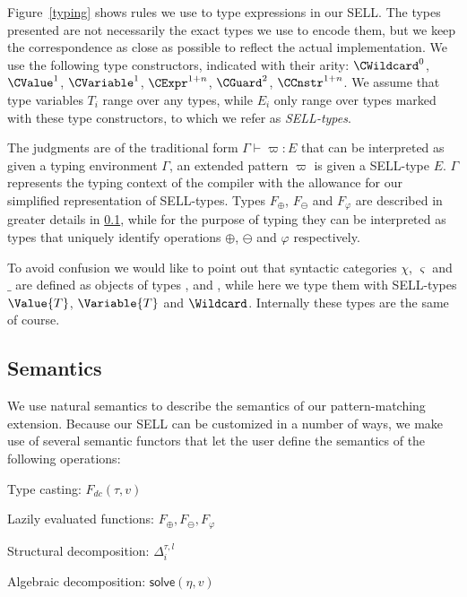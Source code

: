 Figure~\ref{typing} shows rules we use to type expressions in our SELL. The 
types presented are not necessarily the exact \Cpp{} types we use to encode them, 
but we keep the correspondence as close as possible to reflect the actual 
implementation. We use the following type constructors, indicated with their 
arity: $\CWildcard^0$, $\CValue^1$, $\CVariable^1$, $\CExpr^{1+n}$, $\CGuard^2$, 
$\CCnstr^{1+n}$. We assume that type variables $T_i$ range over any \Cpp{} types, 
while $E_i$ only range over types marked with these type constructors, to which 
we refer as \emph{SELL-types}.

The judgments are of the traditional form $\Gamma\vdash \varpi : E$ that can be 
interpreted as given a typing environment $\Gamma$, an extended pattern $\varpi$ is 
given a SELL-type $E$. $\Gamma$ represents the typing context of the \Cpp{} 
compiler with the allowance for our simplified representation of SELL-types.
Types $F_\oplus$, $F_\ominus$ and $F_\varphi$ are described in greater details 
in \textsection\ref{sec:sem}, while for the purpose of typing they can be 
interpreted as types that uniquely identify operations $\oplus$, $\ominus$ and 
$\varphi$ respectively.

To avoid confusion we would like to point out that syntactic categories $\chi$, 
$\varsigma$ and $\_$ are defined as objects of \Cpp{} types , 
 and , while here we type them with SELL-types 
$\Value{T}$, $\Variable{T}$ and $\Wildcard$. Internally these types are the same 
of course.

\subsection{Semantics}
\label{sec:sem}

We use natural semantics\cite{Kahn87} to describe the semantics of our 
pattern-matching extension. Because our SELL can be customized in a number of 
ways, we make use of several semantic functors that let the user define the 
semantics of the following operations:

\begin{compactitem}
\setlength{\itemsep}{0pt}
\setlength{\parskip}{0pt}
\item Type casting: $F_{dc}(\tau,v)$
\item Lazily evaluated functions: $F_\oplus,F_\ominus,F_\varphi$
\item Structural decomposition: $\Delta_i^{\tau,l}$
\item Algebraic decomposition: $\mathsf{solve}(\eta,v)$
\end{compactitem}

